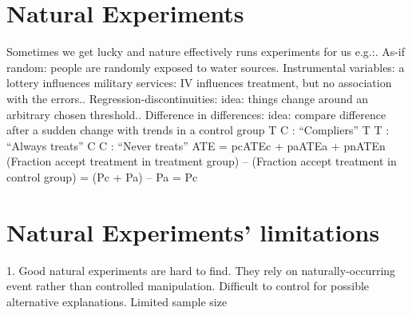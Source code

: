 \section{Natural Experiments}
Sometimes we get lucky and nature effectively runs experiments for us e.g.:. As-if random: people are randomly exposed to water sources. Instrumental variables: a lottery influences military services:\newline
 IV influences treatment, but no association with the errors.. Regression-discontinuities:\newline
 idea: things change around an arbitrary chosen threshold.. Difference in differences:\newline
idea: compare difference after a sudden change with trends in a control group\newline
\newline
T C : “Compliers”\newline
T T : “Always treats”\newline
C C : “Never treats”\newline
\newline
ATE = pcATEc + paATEa + pnATEn\newline
\newline
(Fraction accept treatment in treatment group) – (Fraction accept treatment in control group) = (Pc + Pa) – Pa = Pc \newline
\newline

\section{Natural Experiments’ limitations}
1. Good natural experiments are hard to find. They rely on naturally-occurring event rather than controlled manipulation. Difficult to control for possible alternative explanations. Limited sample size\newline
\newline
\newline


